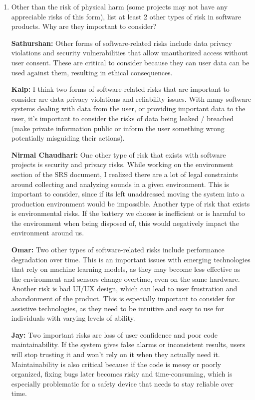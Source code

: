 \documentclass{article}
\begin{document}
\begin{enumerate}
    \item Other than the risk of physical harm (some projects may not have any
    appreciable risks of this form), list at least 2 other types of risk in
    software products. Why are they important to consider?

    \textbf{Sathurshan:} Other forms of software-related risks include data
    privacy violations and security vulnerabilities that allow unauthorized
    access without user consent. These are critical to consider because they can
    user data can be used against them, resulting in ethical consequences.

    \textbf{Kalp:} I think two forms of software-related risks that are
    important to consider are data privacy violations and reliability issues.
    With many software systems dealing with data from the user, or providing
    important data to the user, it's important to consider the risks of data
    being leaked / breached (make private information public or inform the user
    something wrong potentially misguiding their actions).

    \textbf{Nirmal Chaudhari:} One other type of risk that exists with software
    projects is security and privacy risks. While working on the environment
    section of the SRS document, I realized there are a lot of legal constraints
    around collecting and analyzing sounds in a given environment. This is
    important to consider, since if its left unaddressed moving the system into
    a production environment would be impossible. Another type of risk that
    exists is environmental risks. If the battery we choose is inefficient or is
    harmful to the environment when being disposed of, this would negatively
    impact the environment around us. 

    \textbf{Omar:} Two other types of software-related risks include performance
    degradation over time. This is an important issues with emerging
    technologies that rely on machine learning models, as they may become less
    effective as the environment and sensors change overtime, even on the same
    hardware. Another risk is bad UI/UX design, which can lead to user
    frustration and abandonment of the product. This is especially important to
    consider for assistive technologies, as they need to be intuitive and easy
    to use for individuals with varying levels of ability.

    \textbf{Jay:} Two important risks are loss of user confidence and poor code
    maintainability. If the system gives false alarms or inconsistent results,
    users will stop trusting it and won't rely on it when they actually need it.
    Maintainability is also critical because if the code is messy or poorly
    organized, fixing bugs later becomes risky and time-consuming, which is
    especially problematic for a safety device that needs to stay reliable over
    time.
\end{enumerate}
\end{document}
